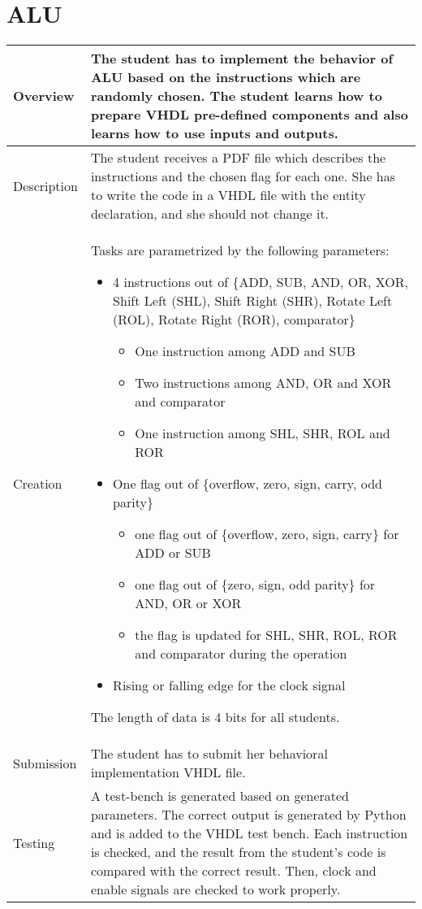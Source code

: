 \section{ALU} \label{alu}
    \begin{tabular}{|p{2cm}|p{11cm}|}
        \hline
        Overview & The student has to implement the behavior of ALU based on the instructions which are randomly chosen.
        The student learns how to prepare VHDL pre-defined components and also learns how to use inputs and outputs.
        \\
        \hline
        Description & The student receives a PDF file which describes the instructions and the chosen flag for each one.
        She has to write the code in a VHDL file with the entity declaration, and she should not change it.
        \\
        \hline
        Creation & Tasks are parametrized by the following parameters:
		\begin{itemize}
			\item 4 instructions out of \{ADD, SUB, AND, OR, XOR, Shift Left (SHL), Shift Right (SHR), Rotate Left (ROL), Rotate Right (ROR), comparator\}
			\begin{itemize}
				\item One instruction among ADD and SUB
				\item Two instructions among AND, OR and XOR and comparator
				\item One instruction among SHL, SHR, ROL and ROR
			\end{itemize}
			\item One flag out of \{overflow, zero, sign, carry, odd parity\}
			\begin{itemize}
				\item one flag out of \{overflow, zero, sign, carry\} for ADD or SUB
				\item one flag out of \{zero, sign, odd parity\} for AND, OR or XOR
				\item the flag is updated for SHL, SHR, ROL, ROR and comparator during the operation
			\end{itemize}
			\item Rising or falling edge for the clock signal
		\end{itemize}
	The length of data is 4 bits for all students.
        \\
        \hline
        Submission & The student has to submit her behavioral implementation VHDL file.
        \\
        \hline
        Testing & A test-bench is generated based on generated parameters. The correct output is generated by Python and is
        added to the VHDL test bench. Each instruction is checked, and the result from the student's code is compared with
        the correct result. Then, clock and enable signals are checked to work properly.
        \\
        \hline
    \end{tabular}
